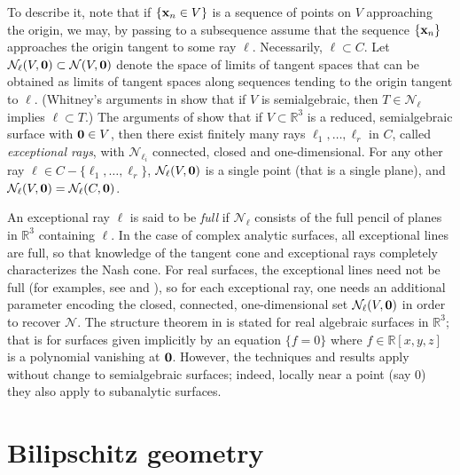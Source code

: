 \documentclass[article]{amsart}
\newcommand{\N}{\mathcal N}
\newcommand{\R}{\mathbb R}
\newcommand{\0}{{\bf 0}}
\newcommand{\x}{{\bf x}}
\begin{document}
To describe it, note that if $\{ \x_n \in V\}$ is a sequence of points on $V$ approaching the origin, we may, by passing to a subsequence assume that the sequence $\{\x_n\}$ approaches the origin tangent to some ray $\ell$.  Necessarily, $\ell \subset C$.  Let $\N_\ell(V, \0) \subset \N(V,\0)$ denote the space of limits of tangent spaces that can be obtained as limits of tangent spaces along sequences tending to the origin tangent to $\ell$.  (Whitney's arguments in \cite{W}  show that if $V$ is semialgebraic, then $T\in \N_\ell$ implies $\ell \subset T$.) The arguments of \cite{OW} show that if $V \subset \R^3$ is a reduced, semialgebraic surface with $\0 \in V$, then there exist finitely many rays 
$\ell_1, \ldots, \ell_r$ in $C$, called {\it exceptional rays}, with $\N_{\ell_i}$ connected, closed and one-dimensional.  For any other ray $\ell \in C - \{ \ell_1, \ldots, \ell_r\}$, $\N_\ell(V, \0)$ is a single point (that is a single plane), and   $\N_\ell(V, \0) = \N_\ell(C, \0)$.  

An exceptional ray $\ell$ is said to be {\it full} if  $\N_\ell$ consists of the full pencil of planes in $\R^3$ containing $\ell$.  In the case of complex analytic surfaces, all exceptional lines are full, so that knowledge of the tangent cone and exceptional rays completely characterizes the Nash cone. For real surfaces, the exceptional lines need not be full (for examples, see \cite{OW} and \cite{OW1}), so for each exceptional ray, one needs an additional parameter encoding the closed, connected, one-dimensional set $\N_\ell (V, \0 )$ in order to recover $\N$.  The structure theorem in \cite{OW} is stated for real algebraic surfaces in $\R^3$; that is for surfaces given implicitly by an equation 
$\{ f= 0\}$ where $f\in \R[x,y,z]$ is a polynomial vanishing at $\0$.  However, the techniques and results apply without change to semialgebraic surfaces; indeed, locally near a point (say $0$) they also apply to subanalytic surfaces.  



\section{Bilipschitz geometry}
\end{document}
